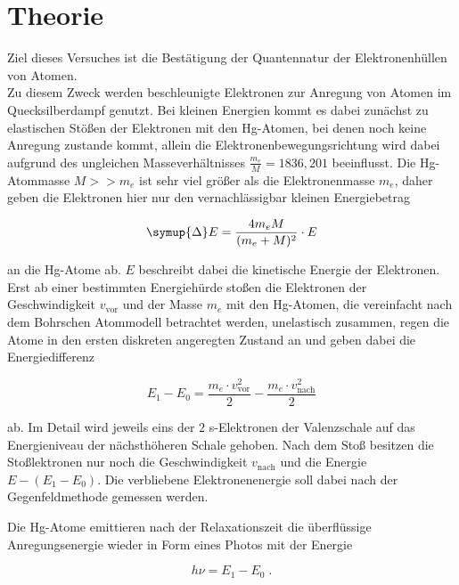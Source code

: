 \section{Theorie}
\label{sec:Theorie}

Ziel dieses Versuches ist die Bestätigung der Quantennatur der Elektronenhüllen von 
Atomen.\\

Zu diesem Zweck werden beschleunigte Elektronen zur Anregung von Atomen 
im Quecksilberdampf genutzt. Bei kleinen Energien kommt es dabei zunächst zu 
elastischen Stößen der Elektronen mit den Hg-Atomen, bei denen noch keine Anregung
zustande kommt, allein die Elektronenbewegungsrichtung wird dabei aufgrund des ungleichen 
Masseverhältnisses $\frac{m_e}{M} = 1836,201$ beeinflusst. Die Hg-Atommasse $M >> m_e$ ist 
sehr viel größer als die Elektronenmasse $m_e$, daher
geben die Elektronen hier nur den vernachlässigbar kleinen Energiebetrag

\begin{equation}
    \symup{\Delta} E = \frac{4 m_e M}{(m_e + M)^2} \cdot E
\end{equation}

an die Hg-Atome ab. $E$ beschreibt dabei die kinetische Energie der Elektronen.\\

Erst ab einer bestimmten Energiehürde stoßen die Elektronen der Geschwindigkeit
$v_\text{vor}$ und der Masse $m_e$ mit den Hg-Atomen, die vereinfacht nach dem Bohrschen Atommodell betrachtet werden,
unelastisch zusammen, regen die Atome in den ersten diskreten angeregten Zustand an und geben dabei
die Energiedifferenz

\begin{equation}
    E_1 - E_0 = \frac{m_e \cdot v_\text{vor}^2}{2} - \frac{m_e \cdot v_\text{nach}^2}{2}
\end{equation}
 
ab. Im Detail wird jeweils eins der $2$ s-Elektronen der Valenzschale auf das Energieniveau der nächsthöheren Schale
gehoben. Nach dem Stoß besitzen die Stoßlektronen nur noch die Geschwindigkeit $v_\text{nach}$ und die Energie
$E - (E_1 - E_0)$.
Die verbliebene Elektronenenergie soll dabei nach der Gegenfeldmethode gemessen werden.

Die Hg-Atome emittieren nach der Relaxationszeit die überflüssige Anregungsenergie wieder
in Form eines Photos mit der Energie 

\begin{equation}
    h \nu = E_1 - E_0 \; .
    \label{eqn:3}
\end{equation}

